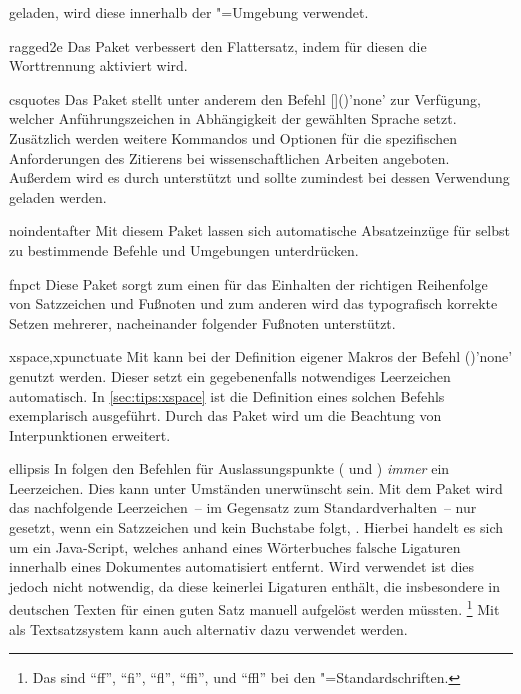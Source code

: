 \begin{packages}
  geladen, wird diese innerhalb der "=Umgebung verwendet.
\item[ragged2e]
  Das Paket verbessert den Flattersatz, indem für diesen die Worttrennung 
  aktiviert wird.
\item[csquotes]
  Das Paket stellt unter anderem den Befehl 
  []()'none'
  zur Verfügung, welcher Anführungszeichen in Abhängigkeit der gewählten 
  Sprache setzt. Zusätzlich werden weitere Kommandos und Optionen für die 
  spezifischen Anforderungen des Zitierens bei wissenschaftlichen Arbeiten 
  angeboten. Außerdem wird es durch  unterstützt und sollte 
  zumindest bei dessen Verwendung geladen werden.
\item[noindentafter]
  Mit diesem Paket lassen sich automatische Absatzeinzüge für selbst zu 
  bestimmende Befehle und Umgebungen unterdrücken.
\item[fnpct]
  Diese Paket sorgt zum einen für das Einhalten der richtigen Reihenfolge von 
  Satzzeichen und Fußnoten und zum anderen wird das typografisch korrekte 
  Setzen mehrerer, nacheinander folgender Fußnoten unterstützt.
\item[xspace,xpunctuate]
  Mit  kann bei der Definition eigener Makros der Befehl 
  ()'none' genutzt werden. Dieser setzt ein 
  gegebenenfalls notwendiges Leerzeichen automatisch. In 
  \autoref{sec:tips:xspace} ist die Definition eines solchen Befehls 
  exemplarisch ausgeführt. Durch das Paket  wird 
   um die Beachtung von Interpunktionen erweitert.
\item[ellipsis]
  In  folgen den Befehlen für Auslassungspunkte ( und 
  ) \emph{immer} ein Leerzeichen. Dies kann unter Umständen 
  unerwünscht sein. Mit dem Paket  wird das nachfolgende 
  Leerzeichen~-- im Gegensatz zum Standardverhalten~-- nur gesetzt, wenn ein 
  Satzzeichen und kein Buchstabe folgt, .
  Hierbei handelt es sich um ein Java-Script, welches anhand eines Wörterbuches 
  falsche Ligaturen innerhalb eines Dokumentes automatisiert entfernt. Wird 
  \Univers verwendet ist dies jedoch nicht notwendig, da diese keinerlei 
  Ligaturen enthält, die insbesondere in deutschen Texten für einen guten Satz 
  manuell aufgelöst werden müssten.%
  \footnote{%
    Das sind \enquote{ff}, \enquote{fi}, \enquote{fl}, \enquote{ffi}, und 
    \enquote{ffl} bei den "=Standardschriften.%
  }
  Mit  als Textsatzsystem kann auch  
  alternativ dazu verwendet werden.
%
\end{packages}


